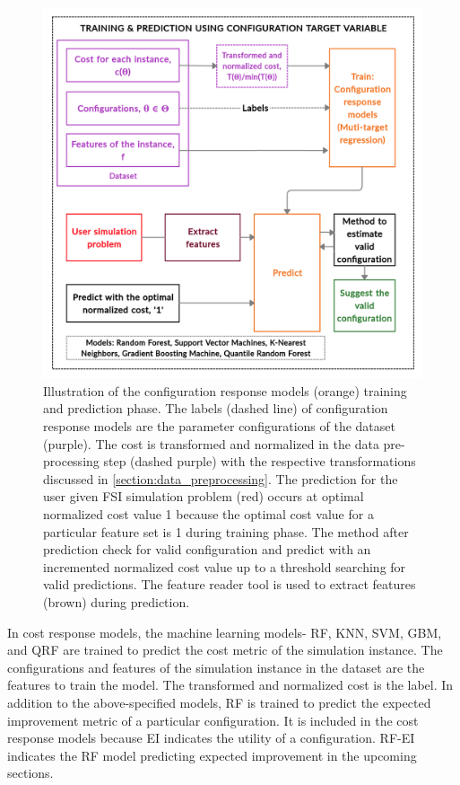 \begin{figure}[!ht]
\centering
\includegraphics[width=0.9\linewidth,height=0.6\textheight]{images/configuration_response.jpg}
\captionsetup{justification=justified}
\caption[Configuration response model training and prediction phase]{Illustration of the configuration response models (orange) training and prediction phase. The labels (dashed line) of configuration response models are the parameter configurations of the dataset (purple). The cost is transformed and normalized in the data pre-processing step (dashed purple) with the respective transformations discussed in \ref{section:data_preprocessing}. The prediction for the user given FSI simulation problem (red) occurs at optimal normalized cost value 1 because the optimal cost value for a particular feature set is 1 during training phase. The method after prediction check for valid configuration and predict with an incremented normalized cost value up to a threshold searching for valid predictions. The feature reader tool is used to extract features (brown) during prediction.}
\label{fig:config_response}
\end{figure}

In cost response models, the machine learning models- RF, KNN, SVM, GBM, and QRF are trained to predict the cost metric of the simulation instance. The configurations and features of the simulation instance in the dataset are the features to train the model. The transformed and normalized cost is the label. In addition to the above-specified models, RF is trained to predict the expected improvement metric of a particular configuration. It is included in the cost response models because EI indicates the utility of a configuration. RF-EI indicates the RF model predicting expected improvement in the upcoming sections.

